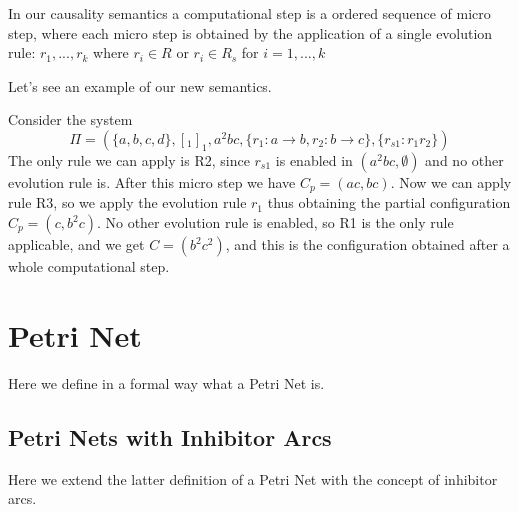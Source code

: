 \begin{definition}
In our causality semantics a computational step is a ordered sequence of micro step, where each micro step is obtained by the application of a single evolution rule: 
$r_1, ..., r_k$ where $r_i \in R$ or $r_i \in R_s$ for $i=1,...,k$
\end{definition}

Let's see an example of our new semantics.
\begin{example}
    Consider the system 
    \[ \Pi = (\{a,b,c,d\},[_1]_1,a^2bc,\{r_1:a \rightarrow b, r_2: b \rightarrow c\}, \{r_{s1}: r_1 r_2\}) \]
    The only rule we can apply is R2, since $r_{s1}$ is enabled in $(a^2bc,\emptyset)$ and no other evolution rule is.
    After this micro step we have $C_p = (ac,bc)$.
    Now we can apply rule R3, so we apply the evolution rule $r_1$ thus obtaining the partial configuration $C_p = (c,b^2c)$.
    No other evolution rule is enabled, so R1 is the only rule applicable, and we get 
    $C = (b^2c^2)$, and this is the configuration obtained after a whole computational step.
\end{example}

\section{Petri Net}

Here we define in a formal way what a Petri Net is.

\subsection{Petri Nets with Inhibitor Arcs}

Here we extend the latter definition of a Petri Net with the concept of inhibitor arcs.
